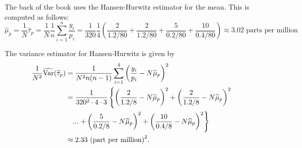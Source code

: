 \documentclass{homework}
\begin{document}
\begin{solution}
  The back of the book uses the Hansen-Hurwitz estimator for the mean.  This is computed as follows:
  $$
    \hat\mu_p = \frac 1N \hat \tau_p = \frac 1{N} \frac 1n \sum_{i=1}^n \frac {y_i}{p_i} = \frac 1{320}\frac14 \left( \frac{2}{1.2/80} +\frac{2}{1.2/80} +\frac{5}{0.2/80} + \frac{10}{0.4/80} \right) \approx  3.02\text{ parts per million }
  $$
\end{solution}

\begin{solution}
  The variance estimator for Hansen-Hurwitz is given by
  \begin{align*}
    \frac 1{N^2} \widehat{\mathrm{Var}}(\widehat\tau_p) 
    &= \frac 1{N^2n(n-1)} \sum_{i=1}^4 \left(\frac{y_i}{p_i} - N\widehat\mu_p\right)^2\\
    &= \frac 1{320^2\cdot 4 \cdot 3} \left\{\left(\frac{2}{1.2/8} - N\widehat\mu_p\right)^2+\left(\frac{2}{1.2/8} - N\widehat\mu_p\right)^2 \right.\\
    &\quad...\left.+\left(\frac{5}{0.2/8} - N\widehat\mu_p\right)^2+\left(\frac{10}{0.4/8} - N\widehat\mu_p\right)^2\right\}\\
    &\approx 2.33\text{ (part per million)}^2.
  \end{align*}
\end{solution}
\end{document}
